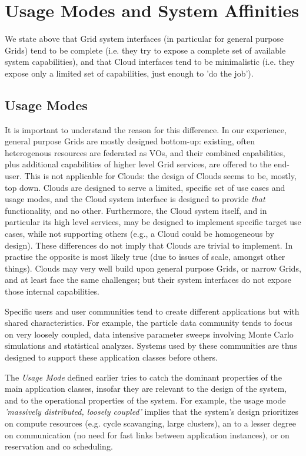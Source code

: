 \documentclass[conference,final]{IEEEtran}
\newcommand{\I}[1]{\textit{#1}}
\begin{document}
\section{Usage Modes and System Affinities}

 We state above that Grid system interfaces (in particular for general
 purpose Grids) tend to be complete (i.e. they try to expose a
 complete set of available system capabilities), and that Cloud
 interfaces tend to be minimalistic (i.e. they expose only a limited
 set of capabilities, just enough to 'do the job').  
 
 \subsection{Usage Modes}

  It is important to understand the reason for this difference.  In
  our experience, general purpose Grids are mostly designed bottom-up:
  existing, often heterogenous resources are federated as VOs, and
  their combined capabilities, plus additional capabilities of higher
  level Grid services, are offered to the end-user.  This is not
  applicable for Clouds: the design of Clouds seems to be, mostly, top
  down. Clouds are designed to serve a limited, specific set of use
  cases and usage modes, and the Cloud system interface is designed to
  provide \I{that} functionality, and no other.  Furthermore, the
  Cloud system itself, and in particular its high level services, may
  be designed to implement specific target use cases, while not
  supporting others (e.g., a Cloud could be homogeneous by design).
  These differences do not imply that Clouds are trivial to implement.
  In practise the opposite is most likely true (due to issues of
  scale, amongst other things). Clouds may very well build upon
  general purpose Grids, or narrow Grids, and at least face the same
  challenges; but their system interfaces do not expose those internal
  capabilities.

  Specific users and user communities tend to create different
  applications but with shared characteristics.  For example, the
  particle data community tends to focus on very loosely coupled, data
  intensive parameter sweeps involving Monte Carlo simulations and
  statistical analyzes.  Systems used by these communities are thus
  designed to support these application classes before others.
  
  The \I{Usage Mode} defined earlier tries to catch the dominant
  properties of the main application classes, insofar they are
  relevant to the design of the system, and to the operational
  properties of the system.  For example, the usage mode \I{'massively
  distributed, loosely coupled'} implies that the system's design
  prioritizes on compute resources (e.g. cycle scavanging, large
  clusters), an to a lesser degree on communication (no need for fast
  links between application instances), or on reservation and co
  scheduling.
\end{document}
